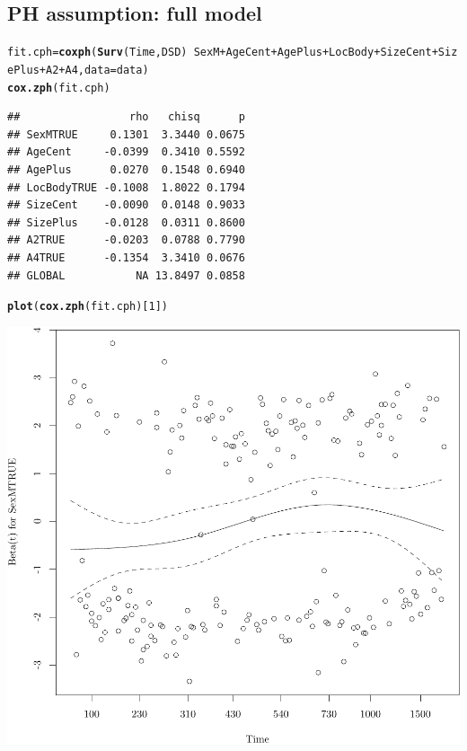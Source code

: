 \documentclass{article}\usepackage[]{graphicx}\usepackage[]{color}
\makeatletter
\def\maxwidth{ %
  \ifdim\Gin@nat@width>\linewidth
    \linewidth
  \else
    \Gin@nat@width
  \fi
}
\newcommand{\hlnum}[1]{\textcolor[rgb]{0.686,0.059,0.569}{#1}}%
\newcommand{\hlopt}[1]{\textcolor[rgb]{0,0,0}{#1}}%
\newcommand{\hlstd}[1]{\textcolor[rgb]{0.345,0.345,0.345}{#1}}%
\newcommand{\hlkwb}[1]{\textcolor[rgb]{0.69,0.353,0.396}{#1}}%
\newcommand{\hlkwc}[1]{\textcolor[rgb]{0.333,0.667,0.333}{#1}}%
\newcommand{\hlkwd}[1]{\textcolor[rgb]{0.737,0.353,0.396}{\textbf{#1}}}%
\newenvironment{kframe}{%
 \def\at@end@of@kframe{}%
 \ifinner\ifhmode%
  \def\at@end@of@kframe{\end{minipage}}%
  \begin{minipage}{\columnwidth}%
 \fi\fi%
 \def\FrameCommand##1{\hskip\@totalleftmargin \hskip-\fboxsep
 \colorbox{shadecolor}{##1}\hskip-\fboxsep
     \hskip-\linewidth \hskip-\@totalleftmargin \hskip\columnwidth}%
 \MakeFramed {\advance\hsize-\width
   \@totalleftmargin\z@ \linewidth\hsize
   \@setminipage}}%
 {\par\unskip\endMakeFramed%
 \at@end@of@kframe}
\newenvironment{knitrout}{}{} %
\makeatother
\begin{document}
\subsection{PH assumption: full model}
\begin{knitrout}
\color{fgcolor}\begin{kframe}
\begin{alltt}
\hlstd{fit.cph} \hlkwb{=} \hlkwd{coxph}\hlstd{(}\hlkwd{Surv}\hlstd{(Time, DSD)} \hlopt{~} \hlstd{SexM} \hlopt{+} \hlstd{AgeCent} \hlopt{+} \hlstd{AgePlus} \hlopt{+} \hlstd{LocBody} \hlopt{+} \hlstd{SizeCent} \hlopt{+} \hlstd{SizePlus} \hlopt{+} \hlstd{A2} \hlopt{+} \hlstd{A4,} \hlkwc{data} \hlstd{= data)}
\hlkwd{cox.zph}\hlstd{(fit.cph)}
\end{alltt}
\begin{verbatim}
##                 rho   chisq      p
## SexMTRUE     0.1301  3.3440 0.0675
## AgeCent     -0.0399  0.3410 0.5592
## AgePlus      0.0270  0.1548 0.6940
## LocBodyTRUE -0.1008  1.8022 0.1794
## SizeCent    -0.0090  0.0148 0.9033
## SizePlus    -0.0128  0.0311 0.8600
## A2TRUE      -0.0203  0.0788 0.7790
## A4TRUE      -0.1354  3.3410 0.0676
## GLOBAL           NA 13.8497 0.0858
\end{verbatim}
\begin{alltt}
\hlkwd{plot}\hlstd{(}\hlkwd{cox.zph}\hlstd{(fit.cph)[}\hlnum{1}\hlstd{])}
\end{alltt}
\end{kframe}

{\centering \includegraphics[width=\maxwidth]{figure/05-eda-ph-check-full-1} 

}
\end{knitrout}
\end{document}

